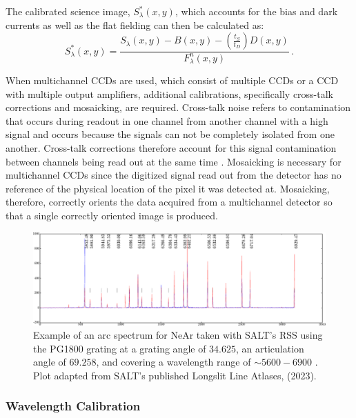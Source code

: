The calibrated science image, $S^{*}_{\lambda}(x,y)$, which accounts for the bias and dark currents as well as the flat fielding can then be calculated as:
\begin{equation}
    S^{*}_{\lambda}(x,y) = \frac{S_{\lambda}(x,y) - B(x,y) - (\frac{t_{S}}{t_{D}})D(x,y)}{F^{n}_{\lambda}(x,y)}\,.\label{eq:science_cal}
\end{equation}

When multichannel \glspl{CCD} are used, which consist of multiple \glspl{CCD} or a \gls{CCD} with multiple output amplifiers, additional calibrations, specifically cross-talk corrections and mosaicking, are required. Cross-talk noise refers to contamination that occurs during readout in one channel from another channel with a high signal and occurs because the signals can not be completely isolated from one another. Cross-talk corrections therefore account for this signal contamination between channels being read out at the same time \citep{CrossTalk}. Mosaicking is necessary for multichannel \glspl{CCD} since the digitized signal read out from the detector has no reference of the physical location of the pixel it was detected at. Mosaicking, therefore, correctly orients the data acquired from a multichannel detector so that a single correctly oriented image is produced.

\begin{figure}[t]
    \centering
    \includegraphics[width = 16cm]{figures/2_Ne_arc.pdf}
    \caption{Example of an arc spectrum for NeAr taken with \gls{SALT}'s \gls{RSS} using the PG1800 grating at a grating angle of $34.625$\degr, an articulation angle of $69.258$\degr, and covering a wavelength range of $\sim5600 - 6900$ \angstrom. Plot adapted from \gls{SALT}'s published Longslit Line Atlases, (2023).\protect\footnotemark}
    \label{fig:Ne_arc}
\end{figure}

\subsubsection{Wavelength Calibration}


